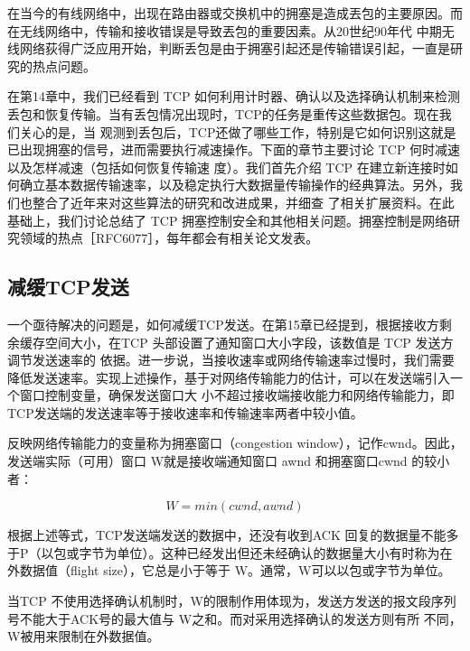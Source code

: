 \begin{tcolorbox}
    在当今的有线网络中，出现在路由器或交换机中的拥塞是造成丟包的主要原因。而在无线网络中，传输和接收错误是导致丟包的重要因素。从20世纪90年代
    中期无线网络荻得广泛应用开始，判断丢包是由于拥塞引起还是传输错误引起，一直是研究的热点问题。
\end{tcolorbox}

在第14章中，我们已经看到 TCP 如何利用计时器、确认以及选择确认机制来检测丢包和恢复传输。当有丢包情况出现时，TCP的任务是重传这些数据包。现在我们关心的是，当
观测到丢包后，TCP还做了哪些工作，特别是它如何识别这就是已出现拥塞的信号，进而需要执行减速操作。下面的章节主要讨论 TCP 何时减速以及怎样减速（包括如何恢复传输速
度）。我们首先介绍 TCP 在建立新连接时如何确立基本数据传输速率，以及稳定执行大数据量传输操作的经典算法。另外，我们也整合了近年来对这些算法的研究和改进成果，并细查
了相关扩展资料。在此基础上，我们讨论总结了 TCP 拥塞控制安全和其他相关问题。拥塞控制是网络研究领域的热点［RFC6077］，每年都会有相关论文发表。

\subsection{减缓TCP发送}
一个亟待解决的问题是，如何减缓TCP发送。在第15章已经提到，根据接收方剩余缓存空间大小，在TCP 头部设置了通知窗口大小字段，该数值是 TCP 发送方调节发送速率的
依据。进一步说，当接收速率或网络传输速率过慢时，我们需要降低发送速率。实现上述操作，基于对网络传输能力的估计，可以在发送端引入一个窗口控制变量，确保发送窗口大
小不超过接收端接收能力和网络传输能力，即TCP发送端的发送速率等于接收速率和传输速率两者中较小值。

反映网络传输能力的变量称为拥塞窗口（congestion window），记作cwnd。因此，发送端实际（可用）窗口 W就是接收端通知窗口 awnd 和拥塞窗口cwnd 的较小者：

\begin{equation}
    W = min (cwnd, awnd)
\end{equation}

根据上述等式，TCP发送端发送的数据中，还没有收到ACK 回复的数据量不能多于P（以包或字节为单位）。这种已经发出但还未经确认的数据量大小有时称为在外数据值（flight
size），它总是小于等于 W。通常，W可以以包或字节为单位。

\begin{tcolorbox}
    当TCP 不使用选择确认机制时，W的限制作用体现为，发送方发送的报文段序列号不能大于ACK号的最大值与 W之和。而对采用选择确认的发送方则有所
    不同，W被用来限制在外数据值。
\end{tcolorbox}

